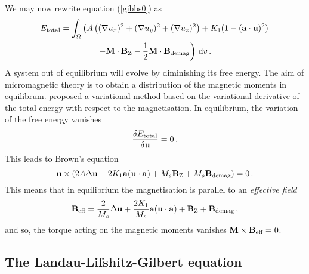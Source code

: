 We may now rewrite equation (\ref{gibbs0}) as
\begin{multline}
E_{\textnormal{total}} = \int_{\Omega} \left( A \left( (\nabla u_x)^2 + (\nabla u_y)^2 + (\nabla u_z)^2 \right) + K_1(1-(\mathbf{a}\cdot\mathbf{u})^2) \right. \\
\left. - \mathbf{M} \cdot \mathbf{B}_{\textnormal{Z}} -\frac{1}{2} \mathbf{M}\cdot\mathbf{B}_{\textnormal{demag}} \right) \, \mathrm{d}v \, .
\end{multline}
A system out of equilibrium will evolve by diminishing its free energy. The aim of micromagnetic theory is to obtain a distribution of the magnetic moments in equilibrum. \citet{BrownMM} proposed a variational method based on the variational derivative of the total energy with respect to the magnetisation. In equilibrium, the variation of the free energy vanishes
\begin{equation}
\frac{\delta E_{\textnormal{total}}}{\delta\mathbf{u}} = 0 \, .
\end{equation}
This leads to Brown's equation
\begin{equation}
\mathbf{u} \times \left( 2A\Delta\mathbf{u} + 2K_1 \mathbf{a}(\mathbf{u}\cdot\mathbf{a}) + M_s \mathbf{B}_{\textnormal{Z}} + M_s \mathbf{B}_{\textnormal{demag}} \right) = 0 \, .
\end{equation}
This means that in equilibrium the magnetisation is parallel to an \textit{effective field}
\begin{equation}
\mathbf{B}_{\textnormal{eff}} = \frac{2}{M_s}\Delta\mathbf{u} + \frac{2K_1}{M_s}\mathbf{a}(\mathbf{u}\cdot\mathbf{a}) + \mathbf{B}_{\textnormal{Z}} + \mathbf{B}_{\textnormal{demag}} \, ,
\end{equation}
and so, the torque acting on the magnetic moments vanishes $\mathbf{M} \times \mathbf{B}_{\textnormal{eff}} = 0$.

\subsection{The Landau-Lifshitz-Gilbert equation}

